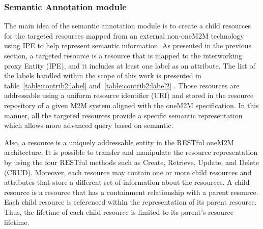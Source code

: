 \subsubsection{Semantic Annotation module}
 The main idea of the semantic annotation module is to create a child resources for the targeted resources mapped from an external non-oneM2M technology using IPE to help represent semantic information. As presented in the previous section, a targeted resource is a resource that is mapped to the interworking proxy Entity (IPE), and it includes at least one label as an attribute. The list of the labels handled within the scope of this work is presented in table~\ref{table:contrib2:label} and~\ref{table:contrib2:label2} . Those resources are addressable using a uniform resource identifier (URI) and stored in the resource repository of a given M2M system aligned with the oneM2M specification. In this manner, all the targeted resources provide a specific semantic representation which allows more advanced query based on semantic.\par
 Also, a resource is a uniquely addressable entity in the RESTful oneM2M architecture. It is possible to transfer and manipulate the resource representation by using the four RESTful methods such as Create, Retrieve, Update, and Delete (CRUD). Moreover, each resource may contain one or more child resources and attributes that store a different set of information about the resources. A child resource is a resource that has a containment relationship with a parent resource. Each child resource is referenced within the representation of its parent resource. Thus, the lifetime of each child resource is limited to its parent’s resource lifetime.\par
{}
